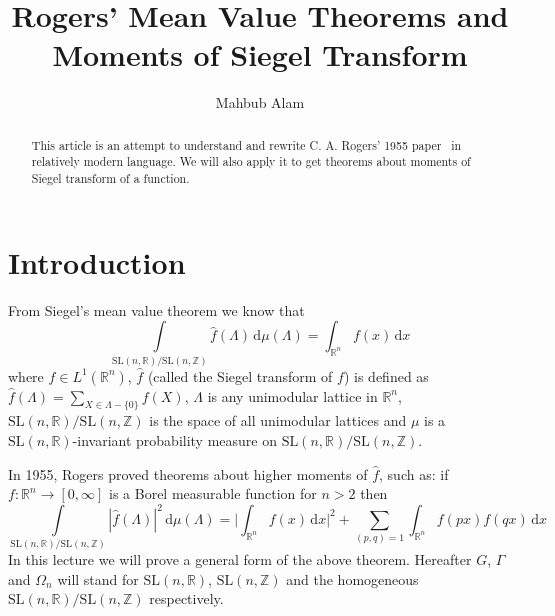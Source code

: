 \documentclass[11pt]{article}
\theoremstyle{definition}
\theoremstyle{proof}
\begin{document}
\title{\bfseries Rogers' Mean Value Theorems and Moments of Siegel Transform}

\author{Mahbub Alam}
\date{}

\maketitle

\begin{abstract}
    This article is an attempt to understand and rewrite C. A. Rogers' 1955 paper~\cite{rogers55b} in relatively modern language.
    We will also apply it to get theorems about moments of Siegel transform of a function.
\end{abstract}

\section{Introduction}
From Siegel's mean value theorem we know that
\[
    \int\limits_{\mathrm{SL}(n,\mathbb{R}) / \mathrm{SL}(n,\mathbb{Z})} \widehat{f}(\Lambda  ) \, \mathrm{d} \mu (\Lambda  ) = \int_{\mathbb{R}^n}f(x) \, \mathrm{d} x
\]
where $f\in L^1(\mathbb{R}^n )$, $\widehat{f}$ (called the Siegel transform of $f$) is defined as $\widehat{f}( \Lambda ) = \displaystyle\sum_{X \in \Lambda - \{0\}} f(X)$, $\Lambda$ is any unimodular lattice in $\mathbb{R}^{n}$, $\mathrm{SL}(n, \mathbb{R})/ \mathrm{SL}(n, \mathbb{Z})$ is the space of all unimodular lattices and $\mu$ is a $\mathrm{SL}(n,\mathbb{R})$-invariant probability measure on $\mathrm{SL}(n,\mathbb{R})/\mathrm{SL}(n,\mathbb{Z})$.

In 1955, Rogers proved theorems about higher moments of $\widehat{f}$, such as: if $f : \mathbb{R}^{n} \to [0, \infty]$ is a Borel measurable function for $n > 2$ then
\[
    \int\limits_{\mathrm{SL}(n,\mathbb{R})/\mathrm{SL}(n,\mathbb{Z})} |\widehat{f}(\Lambda )|^2 \, \mathrm{d} \mu(\Lambda ) = \bigg|\int_{\mathbb{R}^{n}}f(x) \, \mathrm{d} x\bigg|^2 + \displaystyle\sum_{(p,q)=1}\int_{\mathbb{R}^{n}}f(px)f(qx) \, \mathrm{d} x
\]
In this lecture we will prove a general form of the above theorem.
Hereafter $G$, $\Gamma$ and ${\Omega}_n$ will stand for $\mathrm{SL}(n,\mathbb{R})$, $\mathrm{SL}(n,\mathbb{Z})$ and the homogeneous $\mathrm{SL}(n,\mathbb{R})/\mathrm{SL}(n,\mathbb{Z})$ respectively.
\end{document}
